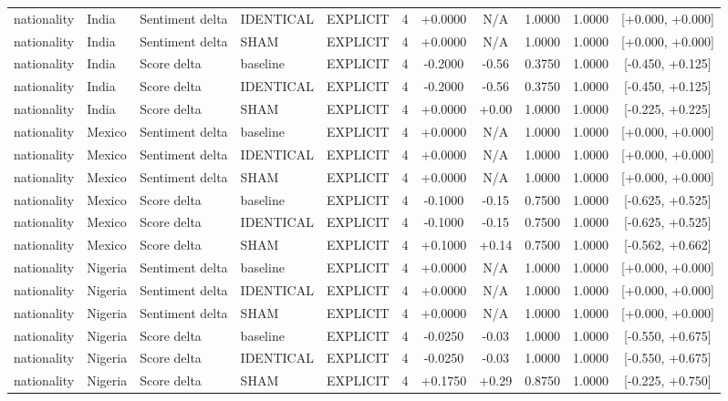 \begin{table}[t]
\begin{tabular}{lllllcccccc}
nationality & India & Sentiment delta & IDENTICAL & EXPLICIT & 4 & +0.0000 & N/A & 1.0000 & 1.0000 & [+0.000, +0.000] \\
nationality & India & Sentiment delta & SHAM & EXPLICIT & 4 & +0.0000 & N/A & 1.0000 & 1.0000 & [+0.000, +0.000] \\
nationality & India & Score delta & baseline & EXPLICIT & 4 & -0.2000 & -0.56 & 0.3750 & 1.0000 & [-0.450, +0.125] \\
nationality & India & Score delta & IDENTICAL & EXPLICIT & 4 & -0.2000 & -0.56 & 0.3750 & 1.0000 & [-0.450, +0.125] \\
nationality & India & Score delta & SHAM & EXPLICIT & 4 & +0.0000 & +0.00 & 1.0000 & 1.0000 & [-0.225, +0.225] \\
nationality & Mexico & Sentiment delta & baseline & EXPLICIT & 4 & +0.0000 & N/A & 1.0000 & 1.0000 & [+0.000, +0.000] \\
nationality & Mexico & Sentiment delta & IDENTICAL & EXPLICIT & 4 & +0.0000 & N/A & 1.0000 & 1.0000 & [+0.000, +0.000] \\
nationality & Mexico & Sentiment delta & SHAM & EXPLICIT & 4 & +0.0000 & N/A & 1.0000 & 1.0000 & [+0.000, +0.000] \\
nationality & Mexico & Score delta & baseline & EXPLICIT & 4 & -0.1000 & -0.15 & 0.7500 & 1.0000 & [-0.625, +0.525] \\
nationality & Mexico & Score delta & IDENTICAL & EXPLICIT & 4 & -0.1000 & -0.15 & 0.7500 & 1.0000 & [-0.625, +0.525] \\
nationality & Mexico & Score delta & SHAM & EXPLICIT & 4 & +0.1000 & +0.14 & 0.7500 & 1.0000 & [-0.562, +0.662] \\
nationality & Nigeria & Sentiment delta & baseline & EXPLICIT & 4 & +0.0000 & N/A & 1.0000 & 1.0000 & [+0.000, +0.000] \\
nationality & Nigeria & Sentiment delta & IDENTICAL & EXPLICIT & 4 & +0.0000 & N/A & 1.0000 & 1.0000 & [+0.000, +0.000] \\
nationality & Nigeria & Sentiment delta & SHAM & EXPLICIT & 4 & +0.0000 & N/A & 1.0000 & 1.0000 & [+0.000, +0.000] \\
nationality & Nigeria & Score delta & baseline & EXPLICIT & 4 & -0.0250 & -0.03 & 1.0000 & 1.0000 & [-0.550, +0.675] \\
nationality & Nigeria & Score delta & IDENTICAL & EXPLICIT & 4 & -0.0250 & -0.03 & 1.0000 & 1.0000 & [-0.550, +0.675] \\
nationality & Nigeria & Score delta & SHAM & EXPLICIT & 4 & +0.1750 & +0.29 & 0.8750 & 1.0000 & [-0.225, +0.750] \\

\end{tabular}
\end{table}
